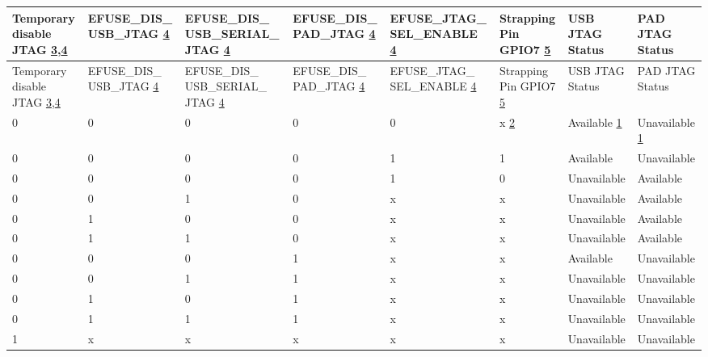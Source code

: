 
\begin{longtable}{ | p{1.4cm} | p{1.9cm} | p{2.1cm} | p{1.9cm} | p{2.1cm} | p{1.4cm} | p{1.7cm} | p{2.0cm} | }
\hline\rowcolor{lightgray}
Temporary disable JTAG \hyperref[JTAG footnote: 3]{3},\hyperref[JTAG footnote: 4]{4} & EFUSE\_DIS\_ USB\_JTAG \hyperref[JTAG footnote: 4]{4} & EFUSE\_DIS\_ USB\_SERIAL\_ JTAG \hyperref[JTAG footnote: 4]{4} & EFUSE\_DIS\_ PAD\_JTAG \hyperref[JTAG footnote: 4]{4} & EFUSE\_JTAG\_ SEL\_ENABLE \hyperref[JTAG footnote: 4]{4} & Strapping Pin GPIO7 \hyperref[JTAG footnote: 5]{5} & USB JTAG Status & PAD JTAG Status \\ \hline
\endfirsthead
\hline
\rowcolor{lightgray}
Temporary disable JTAG \hyperref[JTAG footnote: 3]{3},\hyperref[JTAG footnote: 4]{4} & EFUSE\_DIS\_ USB\_JTAG \hyperref[JTAG footnote: 4]{4} & EFUSE\_DIS\_ USB\_SERIAL\_ JTAG \hyperref[JTAG footnote: 4]{4} & EFUSE\_DIS\_ PAD\_JTAG \hyperref[JTAG footnote: 4]{4} & EFUSE\_JTAG\_ SEL\_ENABLE \hyperref[JTAG footnote: 4]{4} & Strapping Pin GPIO7 \hyperref[JTAG footnote: 5]{5} & USB JTAG Status & PAD JTAG Status \\ \hline
\hline
\endhead
\endfoot

0 & 0 & 0 & 0 & 0 & x \hyperref[JTAG footnote: 2]{2}	& Available	 \hyperref[JTAG footnote: 1]{1}  &     Unavailable  \hyperref[JTAG footnote: 1]{1}  \\\hline
0 & 0 & 0 & 0 & 1 & 1	& Available	  &     Unavailable   \\\hline
0 & 0 & 0 & 0 & 1 & 0	& Unavailable & 	Available \\\hline
0 & 0 & 1 & 0 & x & x	& Unavailable & 	Available \\\hline
0 & 1 & 0 & 0 & x & x	& Unavailable & 	Available \\\hline
0 & 1 & 1 & 0 & x & x	& Unavailable & 	Available \\\hline
0 & 0 & 0 & 1 & x & x	& Available	  &     Unavailable \\\hline
0 & 0 & 1 & 1 & x & x	& Unavailable & 	Unavailable \\\hline
0 & 1 & 0 & 1 & x & x	& Unavailable & 	Unavailable \\\hline
0 & 1 & 1 & 1 & x & x	& Unavailable & 	Unavailable \\\hline
1 & x & x & x & x & x	& Unavailable & 	Unavailable \\\hline

\end{longtable}

